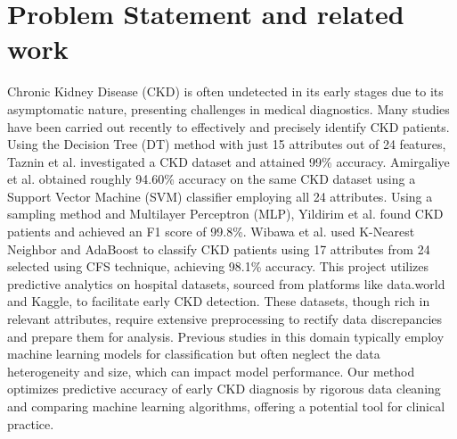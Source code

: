 \documentclass[conference]{IEEEtran}
\begin{document}
\section{Problem Statement and related work}

Chronic Kidney Disease (CKD) is often undetected in its early stages due to its asymptomatic nature, presenting challenges in medical diagnostics. Many studies have been carried out recently to effectively and precisely identify CKD patients. Using the Decision Tree (DT) method with just 15 attributes out of 24 features, Taznin et al. investigated a CKD dataset and attained 99\% accuracy\cite{5}. Amirgaliye et al. obtained roughly 94.60\% accuracy on the same CKD dataset using a Support Vector Machine (SVM) classifier employing all 24 attributes\cite{6}. Using a sampling method and Multilayer Perceptron (MLP), Yildirim et al. found CKD patients and achieved an F1 score of 99.8\%\cite{7}. Wibawa et al. used K-Nearest Neighbor and AdaBoost to classify CKD patients using 17 attributes from 24 selected using CFS technique, achieving 98.1\% accuracy\cite{8}. This project utilizes predictive analytics on hospital datasets, sourced from platforms like data.world and Kaggle, to facilitate early CKD detection\cite{9}. These datasets, though rich in relevant attributes, require extensive preprocessing to rectify data discrepancies and prepare them for analysis. Previous studies in this domain typically employ machine learning models for classification but often neglect the data heterogeneity and size, which can impact model performance. Our method optimizes predictive accuracy of early CKD diagnosis by rigorous data cleaning and comparing machine learning algorithms, offering a potential tool for clinical practice.
\end{document}
